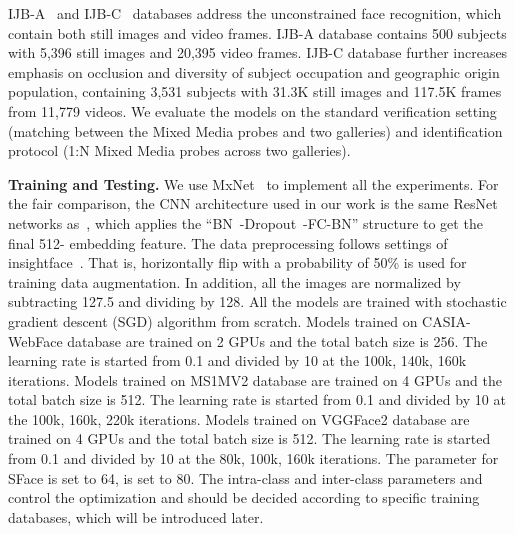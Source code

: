 \documentclass[journal,comsoc]{IEEEtran}
\begin{document}
IJB-A~\cite{klare2015pushing} and IJB-C~\cite{maze2018iarpa} databases address the unconstrained face recognition, which contain both still images and video frames. IJB-A database contains 500 subjects with 5,396 still images and 20,395 video frames. IJB-C database further increases emphasis on occlusion and diversity of subject occupation and geographic origin population, containing 3,531 subjects with 31.3K still images and 117.5K frames from 11,779 videos. We evaluate the models on the standard verification setting (matching between the Mixed Media probes and two galleries) and identification protocol (1:N Mixed Media probes across two galleries).

\textbf{Training and Testing.} We use MxNet~\cite{Chen2015MXNet} to implement all the experiments. For the fair comparison, the CNN architecture used in our work is the same ResNet~\cite{he2016deep} networks as~\cite{deng2019arcface}, which applies the ``BN~\cite{ioffe2015batch}-Dropout~\cite{Srivastava2014Dropout}-FC-BN'' structure to get the final 512- embedding feature. The data preprocessing follows settings of insightface~\cite{deng2019arcface}. That is, horizontally flip with a probability of 50\% is used for training data augmentation. In addition, all the images are normalized by subtracting 127.5 and dividing by 128. All the models are trained with stochastic gradient descent (SGD) algorithm from scratch. Models trained on CASIA-WebFace database are trained on 2 GPUs and the total batch size is 256. The learning rate is started from 0.1 and divided by 10 at the 100k, 140k, 160k iterations. Models trained on MS1MV2 database are trained on 4 GPUs and the total batch size is 512. The learning rate is started from 0.1 and divided by 10 at the 100k, 160k, 220k iterations. Models trained on VGGFace2 database are trained on 4 GPUs and the total batch size is 512. The learning rate is started from 0.1 and divided by 10 at the 80k, 100k, 160k iterations. The parameter  for SFace is set to 64,  is set to 80. The intra-class and inter-class parameters  and  control the optimization and should be decided according to specific training databases, which will be introduced later.
\end{document}
